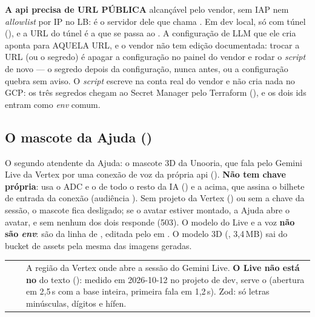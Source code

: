 \begin{atencao}
\textbf{A api precisa de URL PÚBLICA} alcançável pelo vendor, sem IAP nem
\emph{allowlist} por IP no LB: é o servidor dele que chama . Em
dev local, só com túnel (), e a URL do túnel é a que se passa ao
. A configuração
de LLM que ele cria aponta para AQUELA URL, e o vendor não tem edição
documentada: trocar a URL (ou o segredo) é apagar a configuração no painel do
vendor e rodar o \emph{script} de novo --- o segredo depois da configuração, nunca
antes, ou a configuração quebra sem aviso. O \emph{script} escreve na conta real
do vendor e não cria nada no GCP: os três segredos chegam ao Secret Manager pelo
Terraform (), e os dois ids entram como \emph{env} comum.
\end{atencao}

\subsection{O mascote da Ajuda ()}

O segundo atendente da Ajuda: o mascote 3D da Unooria, que fala pelo Gemini Live
da Vertex por uma conexão de voz da própria api ().
\textbf{Não tem chave própria}: usa o ADC e o  de todo o
resto da IA () e a  acima, que assina o
bilhete de entrada da conexão (audiência ). Sem projeto da
Vertex () ou sem a chave da sessão, o mascote fica
desligado; se o avatar estiver montado, a Ajuda abre o avatar, e sem nenhum dos
dois  responde  (503). O modelo
do Live e a voz \textbf{não são \emph{env}}: são da linha de
, editada pelo  em . O
modelo 3D (, 3,4\,MB) sai do bucket de assets
pela mesma  das imagens geradas.

\begin{tabularx}{\linewidth}{@{}L{44mm}L{26mm}X@{}}
\toprule
\headrow {} &  & \\
\midrule
{} &  & A região da Vertex onde abre a
  sessão do Gemini Live. \textbf{O Live não está no } do texto
  (): medido em 2026-10-12 no projeto de dev,
   serve o  (abertura em 2,5\,s com a base
  inteira, primeira fala em 1,2\,s). Zod: só letras minúsculas, dígitos e hífen.\\
\bottomrule
\end{tabularx}

